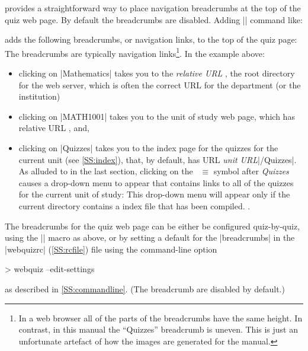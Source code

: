 \documentclass[svgnames]{article}
\makeatletter
\newcommand\macroIndex[1]{%
  \lowercase{\def\temp{#1}}%
  \expandafter\index\expandafter{\temp@\textbackslash#1}%
}
\newcommand\webquizrc{\index{webquizrc}%
  \BashCode|webquizrc| (\autoref{SS:rcfile})\xspace%
}
\makeatother
\begin{document}
  \WebQuiz provides a straightforward way to place navigation breadcrumbs
  at the top of the quiz web page. By default the
  breadcrumbs are disabled. Adding \LatexCode|\BreadCrumbs| command
  like:
  \begin{latexcode}
  \end{latexcode}
  adds the following breadcrumbs, or navigation links,
  to the top of the quiz page:
  The breadcrumbs are typically navigation links\footnote{In a web browser all of the
  parts of the breadcrumbs have the same height. In contrast, in this
  manual the ``Quizzes'' breadcrumb is uneven. This is just an
  unfortunate artefact of how the images are generated for the manual.}.
  In the example above:
  \begin{itemize}
    \item clicking on \BashCode|Mathematics| takes you to the
    \textit{relative URL} \BashCode{/}, the root directory for the web
    server, which is often the correct URL for the department (or the
    institution)
    \item clicking on
    \BashCode|MATH1001| takes you to the
    unit of study web page, which has relative URL , and,
    \item clicking on \BashCode|Quizzes| takes you to the index page for
    the quizzes for the current unit (see \autoref{SS:index}), that, by
    default, has URL \textit{unit URL}\BashCode|/Quizzes|.  As alluded
    to in the last section, clicking on the~{\large\color{red} $\equiv$}
    symbol after \textit{Quizzes} causes a drop-down menu to appear that
    contains links to all of the quizzes for the current unit of study:
    This drop-down menu  will appear only if the current directory
    contains a \WebQuiz index file that has been compiled.
    .
  \end{itemize}
  The breadcrumbs for the quiz web page can be either be configured
  quiz-by-quiz, using the \LatexCode|\BreadCrumbs| macro
  \macroIndex{BreadCrumbs} as above, or by setting a default for the
  \LatexCode|breadcrumbs|  in the \webquizrc file using the
  command-line option
  \begin{bashcode}
    > webquiz --edit-settings
  \end{bashcode}
  as described in \autoref{SS:commandline}.
  (The breadcrumb are disabled by default.)
\end{document}
